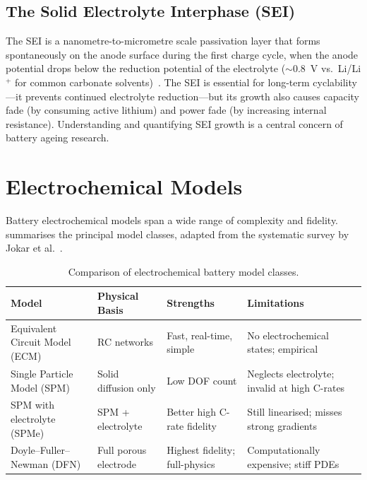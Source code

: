 \subsection{The Solid Electrolyte Interphase (SEI)}
\label{ssec:lit_sei_intro}

The SEI is a nanometre-to-micrometre scale passivation layer that forms spontaneously on the anode surface during the first charge cycle, when the anode potential drops below the reduction potential of the electrolyte ($\sim 0.8$~V vs.\ Li/Li$^+$ for common carbonate solvents)~\cite{Peled1979,Aurbach2000}. The SEI is essential for long-term cyclability---it prevents continued electrolyte reduction---but its growth also causes capacity fade (by consuming active lithium) and power fade (by increasing internal resistance). Understanding and quantifying SEI growth is a central concern of battery ageing research.

\section{Electrochemical Models}
\label{sec:lit_electrochemical_models}

Battery electrochemical models span a wide range of complexity and fidelity.  summarises the principal model classes, adapted from the systematic survey by Jokar et al.~\cite{Jokar2016}.

\begin{table}[H]
\centering
\caption{Comparison of electrochemical battery model classes.}
\label{tab:model_comparison}
\begin{tabular}{p{3.2cm}p{3.5cm}p{3.5cm}p{3.5cm}}
\toprule
\textbf{Model} & \textbf{Physical Basis} & \textbf{Strengths} & \textbf{Limitations} \\
\midrule
Equivalent Circuit Model (ECM) & RC networks & Fast, real-time, simple & No electrochemical states; empirical \\[4pt]
Single Particle Model (SPM) & Solid diffusion only & Low DOF count & Neglects electrolyte; invalid at high C-rates \\[4pt]
SPM with electrolyte (SPMe) & SPM + electrolyte & Better high C-rate fidelity & Still linearised; misses strong gradients \\[4pt]
Doyle--Fuller--Newman (DFN) & Full porous electrode & Highest fidelity; full-physics & Computationally expensive; stiff PDEs \\
\bottomrule
\end{tabular}
\end{table}

